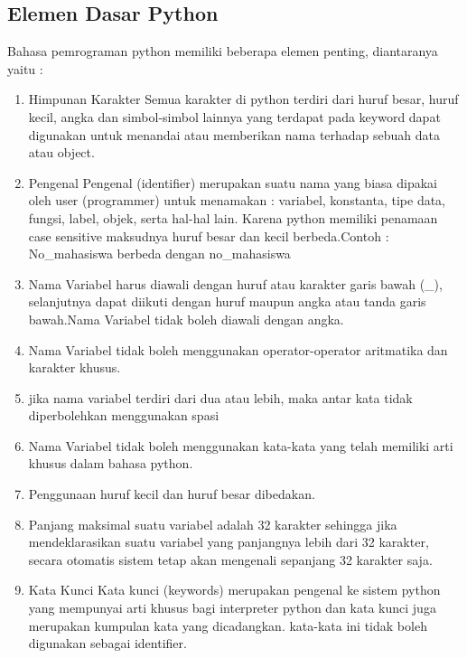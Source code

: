 \subsection{Elemen Dasar Python}
Bahasa pemrograman python memiliki beberapa elemen penting, diantaranya yaitu :
\begin{enumerate}
\item Himpunan Karakter
		Semua karakter di python terdiri dari huruf besar, huruf kecil, angka dan simbol-simbol lainnya yang terdapat pada keyword dapat digunakan untuk menandai atau memberikan nama terhadap sebuah data atau object.
\item Pengenal 
		Pengenal (identifier) merupakan suatu nama yang biasa dipakai oleh user (programmer) untuk menamakan : variabel, konstanta, tipe data, fungsi, label, objek, serta hal-hal lain. Karena python memiliki penamaan case sensitive maksudnya huruf besar dan kecil berbeda.Contoh : No_mahasiswa berbeda dengan no_mahasiswa
	\item Nama Variabel harus diawali dengan huruf atau karakter garis bawah (_), selanjutnya dapat diikuti dengan huruf maupun 	angka atau tanda garis bawah.Nama Variabel tidak boleh diawali dengan angka.
	\item Nama Variabel tidak boleh menggunakan operator-operator aritmatika dan karakter khusus.
	\item jika nama variabel terdiri dari dua atau lebih, maka antar kata tidak diperbolehkan menggunakan spasi
	\item Nama Variabel tidak boleh menggunakan kata-kata yang telah memiliki arti khusus dalam bahasa python.
	\item Penggunaan huruf kecil dan huruf besar dibedakan.
	\item Panjang maksimal suatu variabel adalah 32 karakter sehingga jika mendeklarasikan suatu variabel yang panjangnya lebih dari 32 karakter, secara otomatis sistem tetap akan mengenali sepanjang 32 karakter saja.
\item Kata Kunci
		Kata kunci (keywords) merupakan pengenal ke sistem python yang mempunyai arti khusus bagi interpreter python dan kata kunci juga merupakan kumpulan kata yang dicadangkan. kata-kata ini tidak boleh digunakan sebagai identifier.
\end{enumerate}
